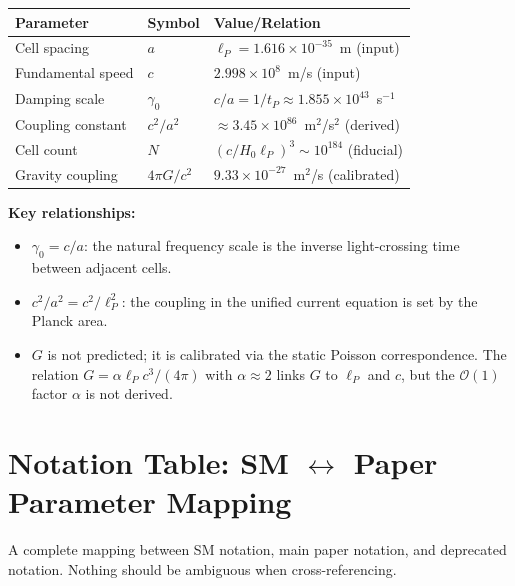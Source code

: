 \documentclass[reprint]{revtex4-2}
\begin{document}
\begin{center}
\begin{tabular}{lll}
\toprule
Parameter & Symbol & Value/Relation \\
\midrule
Cell spacing & $a$ & $\ell_P = 1.616\times 10^{-35}$~m (input) \\
Fundamental speed & $c$ & $2.998\times 10^8$~m/s (input) \\
Damping scale & $\gamma_0$ & $c/a = 1/t_P \approx 1.855\times 10^{43}$~s$^{-1}$ \\
Coupling constant & $c^2/a^2$ & $\approx 3.45\times 10^{86}$~m$^2$/s$^2$ (derived) \\
Cell count & $N$ & $(c/H_0\ell_P)^3 \sim 10^{184}$ (fiducial) \\
Gravity coupling & $4\pi G/c^2$ & $9.33\times 10^{-27}$~m$^2$/s (calibrated) \\
\bottomrule
\end{tabular}
\end{center}

\textbf{Key relationships:}
\begin{itemize}
\item $\gamma_0 = c/a$: the natural frequency scale is the inverse light-crossing time between adjacent cells.
\item $c^2/a^2 = c^2/\ell_P^2$: the coupling in the unified current equation is set by the Planck area.
\item $G$ is not predicted; it is calibrated via the static Poisson correspondence. The relation $G = \alpha\ell_P c^3/(4\pi)$ with $\alpha \approx 2$ links $G$ to $\ell_P$ and $c$, but the $\mathcal{O}(1)$ factor $\alpha$ is not derived.
\end{itemize}

\section{Notation Table: SM $\leftrightarrow$ Paper Parameter Mapping}

A complete mapping between SM notation, main paper notation, and deprecated notation. Nothing should be ambiguous when cross-referencing.
\end{document}
